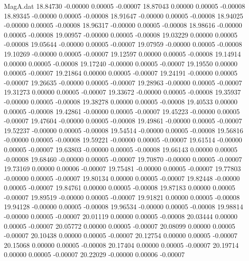 \begin{filecontents}{MagA.dat}
  18.84730   -0.00000    0.00005   -0.00007
  18.87043    0.00000    0.00005   -0.00008
  18.89345   -0.00000    0.00005   -0.00008
  18.91647   -0.00000    0.00005   -0.00008
  18.94025   -0.00000    0.00005   -0.00008
  18.96317   -0.00000    0.00005   -0.00008
  18.98616   -0.00000    0.00005   -0.00008
  19.00957   -0.00000    0.00005   -0.00008
  19.03229    0.00000    0.00005   -0.00008
  19.05644   -0.00000    0.00005   -0.00007
  19.07959   -0.00000    0.00005   -0.00008
  19.10269   -0.00000    0.00005   -0.00007
  19.12597    0.00000    0.00005   -0.00008
  19.14914    0.00000    0.00005   -0.00008
  19.17240   -0.00000    0.00005   -0.00007
  19.19550    0.00000    0.00005   -0.00007
  19.21864    0.00000    0.00005   -0.00007
  19.24191   -0.00000    0.00005   -0.00007
  19.26635   -0.00000    0.00005   -0.00007
  19.28963   -0.00000    0.00005   -0.00007
  19.31273    0.00000    0.00005   -0.00007
  19.33672   -0.00000    0.00005   -0.00008
  19.35937   -0.00000    0.00005   -0.00008
  19.38278    0.00000    0.00005   -0.00008
  19.40533    0.00000    0.00005   -0.00008
  19.42861   -0.00000    0.00005   -0.00007
  19.45223   -0.00000    0.00005   -0.00007
  19.47604   -0.00000    0.00005   -0.00008
  19.49861   -0.00000    0.00005   -0.00007
  19.52237   -0.00000    0.00005   -0.00008
  19.54514   -0.00000    0.00005   -0.00008
  19.56816   -0.00000    0.00005   -0.00008
  19.59221   -0.00000    0.00005   -0.00007
  19.61514   -0.00000    0.00005   -0.00007
  19.63803   -0.00000    0.00005   -0.00008
  19.66143    0.00000    0.00005   -0.00008
  19.68460   -0.00000    0.00005   -0.00007
  19.70870   -0.00000    0.00005   -0.00007
  19.73169    0.00000    0.00006   -0.00007
  19.75481   -0.00000    0.00005   -0.00007
  19.77803   -0.00000    0.00005   -0.00007
  19.80134    0.00000    0.00005   -0.00007
  19.82448   -0.00000    0.00005   -0.00007
  19.84761    0.00000    0.00005   -0.00008
  19.87183    0.00000    0.00005   -0.00007
  19.89519   -0.00000    0.00005   -0.00007
  19.91821    0.00000    0.00005   -0.00008
  19.94128   -0.00000    0.00005   -0.00008
  19.96534   -0.00000    0.00005   -0.00008
  19.98814   -0.00000    0.00005   -0.00007
  20.01119    0.00000    0.00005   -0.00008
  20.03444    0.00000    0.00005   -0.00007
  20.05772    0.00000    0.00005   -0.00007
  20.08099    0.00000    0.00005   -0.00007
  20.10438    0.00000    0.00005   -0.00007
  20.12754    0.00000    0.00005   -0.00007
  20.15068    0.00000    0.00005   -0.00008
  20.17404    0.00000    0.00005   -0.00007
  20.19714    0.00000    0.00005   -0.00007
  20.22029   -0.00000    0.00006   -0.00007

\end{filecontents}
